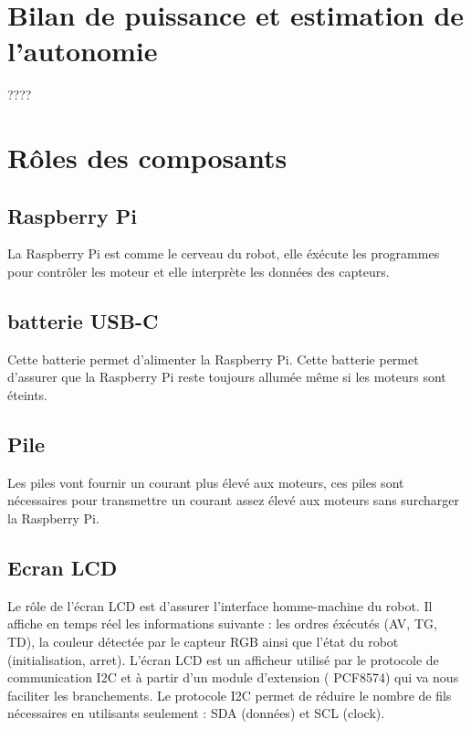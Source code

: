 \section{Bilan de puissance et estimation de l'autonomie}
????

\section{Rôles des composants}

\subsection{Raspberry Pi}
La Raspberry Pi est comme le cerveau du robot, elle éxécute les programmes pour contrôler les moteur et elle interprète les données des capteurs.

\subsection{batterie USB-C}
Cette batterie permet d'alimenter la Raspberry Pi. Cette batterie permet d'assurer que la Raspberry Pi reste toujours allumée même si les moteurs sont éteints.

\subsection{Pile}
Les piles vont fournir un courant plus élevé aux moteurs, ces piles sont nécessaires pour transmettre un courant assez élevé aux moteurs sans surcharger la Raspberry Pi.

\subsection{Ecran LCD} 
Le rôle de l'écran LCD est d'assurer l'interface homme-machine du robot. Il affiche en temps réel les informations suivante : les ordres éxécutés (AV, TG, TD), la couleur détectée par le capteur RGB ainsi que l'état du robot (initialisation, arret).
L'écran LCD est un afficheur utilisé par le protocole de communication I2C et à partir d'un module d'extension ( PCF8574) qui va nous faciliter les branchements.
Le protocole I2C permet de réduire le nombre de fils nécessaires en utilisants seulement : SDA (données) et SCL (clock).

